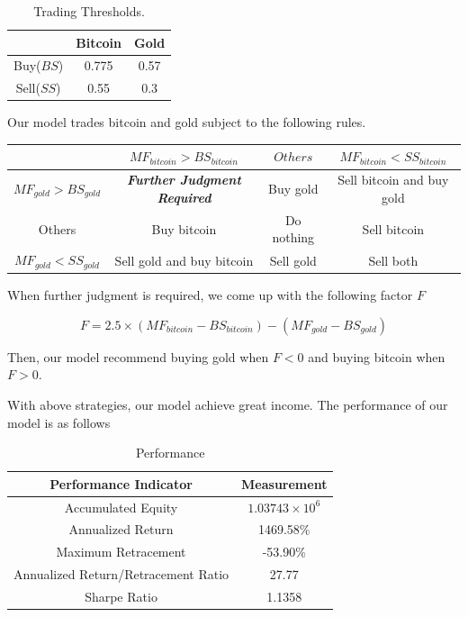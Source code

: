 \documentclass[12pt,a4paper]{article}
\begin{document}
\begin{spacing}{1.2}
\begin{enumerate}
	\begin{table}[H]
		\renewcommand{\arraystretch}{1.5}
		\caption{Trading Thresholds.}
		\label{table:memo_threshold}
		\begin{center}
			{\footnotesize
				\begin{tabular}{c c c}
					\toprule
					{ } & {Bitcoin} & {Gold} \\
					\midrule
					Buy($BS$) & 0.775 & 0.57 \\
					Sell($SS$) & 0.55 & 0.3 \\
					\bottomrule
			\end{tabular}}
		\end{center}	
	\end{table}

	Our model trades bitcoin and gold subject to the following rules.
	
	\begin{center}
		\begin{tabular}{ |c|c|c|c| } 
			\hline
			 & $MF_{bitcoin} > BS_{bitcoin}$ & $Others$ & $MF_{bitcoin} < SS_{bitcoin}$ \\ 
			\hline
			$MF_{gold} > BS_{gold}$ & \textbf{\textit{Further Judgment Required}}  & Buy gold & Sell bitcoin and buy gold  \\ 
			\hline
			Others & Buy bitcoin & Do nothing & Sell bitcoin \\
			\hline
			$MF_{gold} < SS_{gold}$ & Sell gold and buy bitcoin & Sell gold & Sell both \\ 
			\hline
		\end{tabular}
	\end{center}

	When further judgment is required, we come up with the following factor $F$ 
	
	$$
	F=2.5 \times (MF_{bitcoin}-BS_{bitcoin})-(MF_{gold}-BS_{gold})
	$$
	
	Then, our model recommend buying gold when $F<0$ and buying bitcoin when $F>0$.
\end{enumerate}

With above strategies, our model achieve great income. The performance of our model is as follows

	\begin{table}[H]
	\renewcommand{\arraystretch}{1.5}
	\caption{Performance}
	\label{table:memo_performance}
	\begin{center}
		{\footnotesize
			\begin{tabular}{c c }
				\toprule
				Performance Indicator & Measurement\\
				\midrule
				Accumulated Equity & $1.03743 \times 10^6$ \\
				Annualized Return & 1469.58\% \\
				Maximum Retracement & -53.90\% \\
				Annualized Return/Retracement Ratio & 27.77 \\
				Sharpe Ratio & 1.1358 \\
				\bottomrule
		\end{tabular}}
	\end{center}	
\end{table}



\end{spacing}
\end{document}
